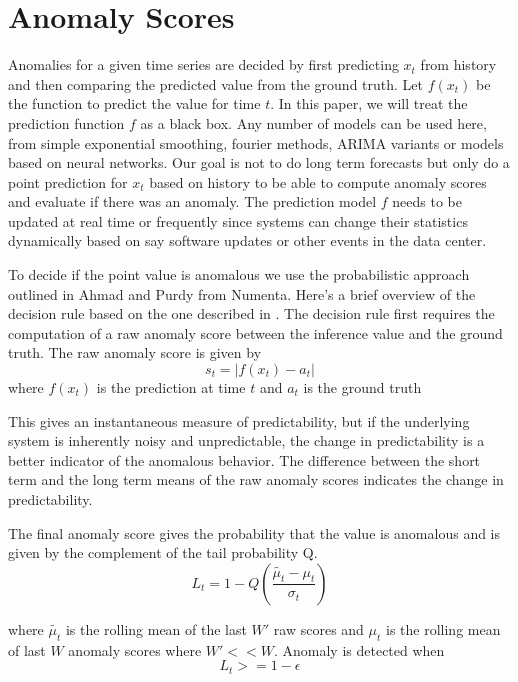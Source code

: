 \documentclass[times, twoside, watermark]{zHenriquesLab-StyleBioRxiv}
\begin{document}
\section*{Anomaly Scores}
Anomalies for a given time series are decided by first predicting $x_t$ from history and then comparing the predicted value from the ground truth. Let $f(x_t)$ be the function to predict the value for time $t$. In this paper, we will treat the prediction function $f$ as a black box. Any number of models can be used here, from simple exponential smoothing, fourier methods, ARIMA variants or models based on neural networks. Our goal is not to do long term forecasts but only do a point prediction for $x_t$ based on history to be able to compute anomaly scores and evaluate if there was an anomaly. The prediction model $f$ needs to be updated at real time or frequently since systems can change their statistics dynamically based on say software updates or other events in the data center.

To decide if the point value is anomalous we use the probabilistic approach outlined in Ahmad and Purdy from Numenta\cite{ahmadpurdy}. Here's a brief overview of the decision rule based on the one described in \cite{ahmadpurdy}. The decision rule first requires the computation of a raw anomaly score between the inference value and the ground truth. The raw anomaly score is given by 
$$s_t =| f(x_t) - a_t | $$
where $f(x_t)$ is the prediction at time $t$ and $a_t$ is the ground truth

This gives an instantaneous measure of predictability, but if the underlying system is inherently noisy and unpredictable, the change in predictability is a better indicator of the anomalous behavior. The difference between the short term and the long term means of the raw anomaly scores indicates the change in predictability. 

The final anomaly score gives the probability that the value is anomalous and is given by the complement of the tail probability Q\cite{tailprob}.
\begin{equation}
L_t = 1 - Q(\frac{\tilde{\mu_t} - \mu_t}{\sigma_t})
\end{equation}

where $\tilde{\mu_t}$ is the rolling mean of the last $W'$ raw scores and $\mu_t$ is the rolling mean of last $W$ anomaly scores where $W' << W$. Anomaly is detected when 
\begin{equation}
L_t >= 1 - \epsilon
\end{equation}
\end{document}
